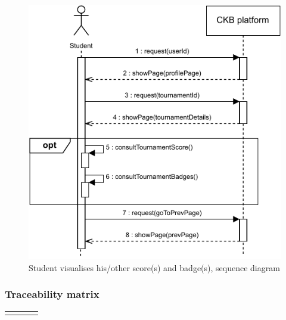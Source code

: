 \documentclass{article}
\begin{document}
{\begin{enumerate}
          \begin{figure}[H]
              \centering
              \includegraphics[scale=0.95]{images/SequenceDiagrams/Sequence13.pdf}
              \caption{Student visualises his/other score(s) and badge(s), sequence diagram}
              \label{fig:ScoresBadgesVisualizationSeqDiagram}
          \end{figure}
\end{enumerate}

\newpage
\subsubsection{Traceability matrix}
\begin{xltabular}{\textwidth}
    {| >{\raggedright\arraybackslash}g | >{\raggedright\arraybackslash}X | >{\raggedright\arraybackslash}X | >{\raggedright\arraybackslash}X |}
    \hline
    \endfirsthead
    \hline
    \endhead
    \endfoot
    \hline
    \endlastfoot


\end{xltabular}}
\end{document}
